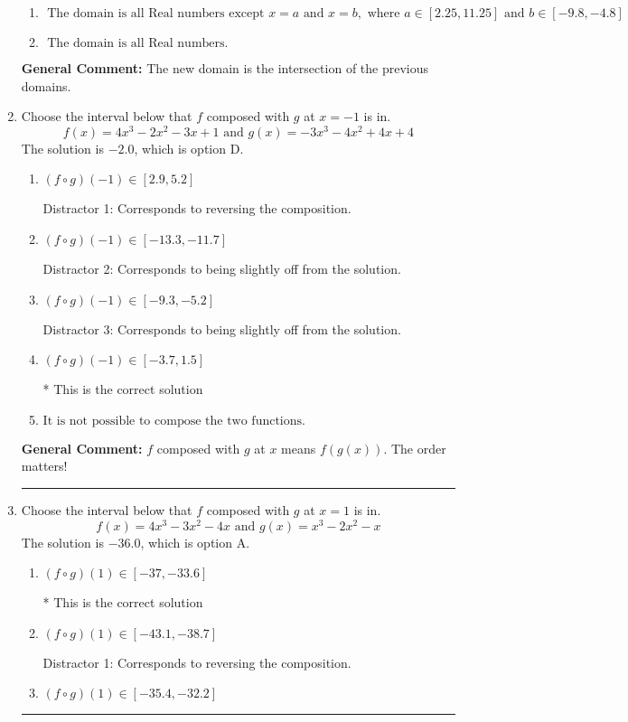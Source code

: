 \documentclass{extbook}[14pt]
\newcommand{\litem}[1]{\item #1

\rule{\textwidth}{0.4pt}}
\begin{document}
\begin{enumerate}
{\begin{enumerate}[label=\Alph*.]
\item \( \text{ The domain is all Real numbers except } x = a \text{ and } x = b, \text{ where } a \in [2.25, 11.25] \text{ and } b \in [-9.8, -4.8] \)


\item \( \text{ The domain is all Real numbers. } \)


\end{enumerate}

\textbf{General Comment:} The new domain is the intersection of the previous domains.
}
\litem{
Choose the interval below that $f$ composed with $g$ at $x=-1$ is in.
\[ f(x) = 4x^{3} -2 x^{2} -3 x + 1 \text{ and } g(x) = -3x^{3} -4 x^{2} +4 x + 4 \]The solution is \( -2.0 \), which is option D.\begin{enumerate}[label=\Alph*.]
\item \( (f \circ g)(-1) \in [2.9, 5.2] \)

 Distractor 1: Corresponds to reversing the composition.
\item \( (f \circ g)(-1) \in [-13.3, -11.7] \)

 Distractor 2: Corresponds to being slightly off from the solution.
\item \( (f \circ g)(-1) \in [-9.3, -5.2] \)

 Distractor 3: Corresponds to being slightly off from the solution.
\item \( (f \circ g)(-1) \in [-3.7, 1.5] \)

* This is the correct solution
\item \( \text{It is not possible to compose the two functions.} \)


\end{enumerate}

\textbf{General Comment:} $f$ composed with $g$ at $x$ means $f(g(x))$. The order matters!
}
\litem{
Choose the interval below that $f$ composed with $g$ at $x=1$ is in.
\[ f(x) = 4x^{3} -3 x^{2} -4 x \text{ and } g(x) = x^{3} -2 x^{2} -x \]The solution is \( -36.0 \), which is option A.\begin{enumerate}[label=\Alph*.]
\item \( (f \circ g)(1) \in [-37, -33.6] \)

* This is the correct solution
\item \( (f \circ g)(1) \in [-43.1, -38.7] \)

 Distractor 1: Corresponds to reversing the composition.
\item \( (f \circ g)(1) \in [-35.4, -32.2] \)


\end{enumerate}}
\end{enumerate}
\end{document}

